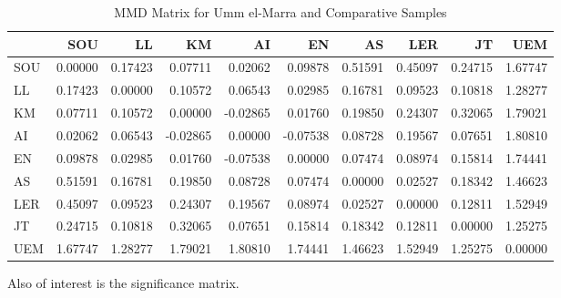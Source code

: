 \documentclass[]{book}
\begin{document}
\begin{table}

\caption{\label{tab:unnamed-chunk-4}MMD Matrix for Umm el-Marra and Comparative Samples}
\centering
\begin{tabular}[t]{l|r|r|r|r|r|r|r|r|r}
\hline
  & SOU & LL & KM & AI & EN & AS & LER & JT & UEM\\
\hline
SOU & 0.00000 & 0.17423 & 0.07711 & 0.02062 & 0.09878 & 0.51591 & 0.45097 & 0.24715 & 1.67747\\
\hline
LL & 0.17423 & 0.00000 & 0.10572 & 0.06543 & 0.02985 & 0.16781 & 0.09523 & 0.10818 & 1.28277\\
\hline
KM & 0.07711 & 0.10572 & 0.00000 & -0.02865 & 0.01760 & 0.19850 & 0.24307 & 0.32065 & 1.79021\\
\hline
AI & 0.02062 & 0.06543 & -0.02865 & 0.00000 & -0.07538 & 0.08728 & 0.19567 & 0.07651 & 1.80810\\
\hline
EN & 0.09878 & 0.02985 & 0.01760 & -0.07538 & 0.00000 & 0.07474 & 0.08974 & 0.15814 & 1.74441\\
\hline
AS & 0.51591 & 0.16781 & 0.19850 & 0.08728 & 0.07474 & 0.00000 & 0.02527 & 0.18342 & 1.46623\\
\hline
LER & 0.45097 & 0.09523 & 0.24307 & 0.19567 & 0.08974 & 0.02527 & 0.00000 & 0.12811 & 1.52949\\
\hline
JT & 0.24715 & 0.10818 & 0.32065 & 0.07651 & 0.15814 & 0.18342 & 0.12811 & 0.00000 & 1.25275\\
\hline
UEM & 1.67747 & 1.28277 & 1.79021 & 1.80810 & 1.74441 & 1.46623 & 1.52949 & 1.25275 & 0.00000\\
\hline
\end{tabular}
\end{table}

Also of interest is the significance matrix.
\end{document}

